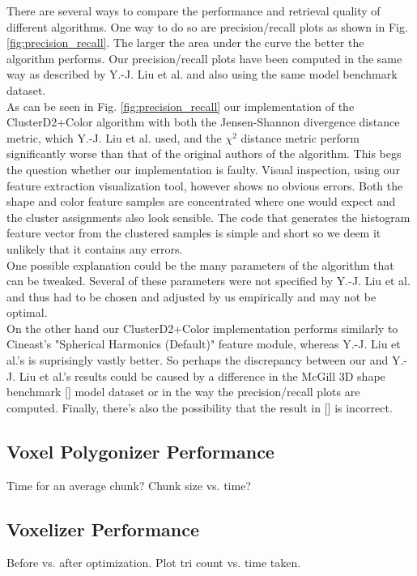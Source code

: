 There are several ways to compare the performance and retrieval quality of different algorithms. One way to do so are precision/recall plots as shown in Fig. \ref{fig:precision_recall}. The larger the area under the
curve the better the algorithm performs. Our precision/recall plots have been computed in the same way as described by Y.-J. Liu et al.  and also using the same model benchmark dataset.\\
As can be seen in Fig. \ref{fig:precision_recall} our implementation of the ClusterD2+Color algorithm with both the Jensen-Shannon divergence distance metric, which Y.-J. Liu et al. used,
and the $\chi^2$ distance metric perform significantly worse than that of the original authors of the algorithm. This begs the question whether our implementation is faulty. Visual inspection, using our feature
extraction visualization tool, however shows no obvious errors. Both the shape and color feature samples are concentrated where one would expect and the cluster assignments also look sensible. The code that generates
the histogram feature vector from the clustered samples is simple and short so we deem it unlikely that it contains any errors.\\
One possible explanation could be the many parameters of the algorithm that can be tweaked. Several of these parameters were not specified by Y.-J. Liu et al. and thus had to be chosen and adjusted by us empirically
and may not be optimal.\\
On the other hand our ClusterD2+Color implementation performs similarly to Cineast's "Spherical Harmonics (Default)" feature module, whereas Y.-J. Liu et al.'s is suprisingly vastly better.
So perhaps the discrepancy between our and Y.-J. Liu et al.'s results could be caused by a difference in the McGill 3D shape benchmark [] model dataset or in the way the precision/recall plots are computed. Finally, there's also the possibility that the result in [] is incorrect.


\subsection{Voxel Polygonizer Performance}
Time for an average chunk? Chunk size vs. time?

\subsection{Voxelizer Performance}
Before vs. after optimization. Plot tri count vs. time taken.

